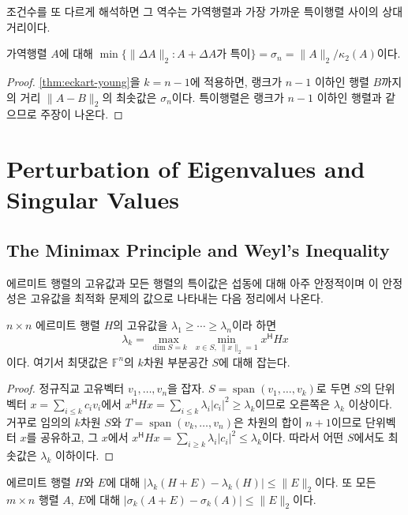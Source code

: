 조건수를 또 다르게 해석하면 그 역수는 가역행렬과 가장 가까운 특이행렬 사이의 상대 거리이다.

\begin{theorem}
\label{thm:dist-singular}
가역행렬 $A$에 대해 $\min\{\|\Delta A\|_2:A+\Delta A\text{가 특이}\}=\sigma_n=\|A\|_2/\kappa_2(A)$이다.
\end{theorem}

\begin{proof}
\cref{thm:eckart-young}을 $k=n-1$에 적용하면, 랭크가 $n-1$ 이하인 행렬 $B$까지의 거리 $\|A-B\|_2$의 최솟값은 $\sigma_n$이다. 특이행렬은 랭크가 $n-1$ 이하인 행렬과 같으므로 주장이 나온다.
\end{proof}

\section{Perturbation of Eigenvalues and Singular Values}
\label{sec:perturbation}

\subsection{The Minimax Principle and Weyl's Inequality}

에르미트 행렬의 고유값과 모든 행렬의 특이값은 섭동에 대해 아주 안정적이며 이 안정성은 고유값을 최적화 문제의 값으로 나타내는 다음 정리에서 나온다.

\begin{theorem}
\label{thm:courant-fischer}
$n\times n$ 에르미트 행렬 $H$의 고유값을 $\lambda_1\ge\cdots\ge\lambda_n$이라 하면
\[
\lambda_k=\max_{\dim S=k}\ \min_{x\in S,\ \|x\|_2=1}x^{\mathsf H}Hx
\]
이다. 여기서 최댓값은 $\mathbb{F}^n$의 $k$차원 부분공간 $S$에 대해 잡는다.
\end{theorem}

\begin{proof}
정규직교 고유벡터 $v_1,\dots,v_n$을 잡자. $S=\operatorname{span}(v_1,\dots,v_k)$로 두면 $S$의 단위벡터 $x=\sum_{i\le k}c_iv_i$에서 $x^{\mathsf H}Hx=\sum_{i\le k}\lambda_i|c_i|^2\ge\lambda_k$이므로 오른쪽은 $\lambda_k$ 이상이다. 거꾸로 임의의 $k$차원 $S$와 $T=\operatorname{span}(v_k,\dots,v_n)$은 차원의 합이 $n+1$이므로 단위벡터 $x$를 공유하고, 그 $x$에서 $x^{\mathsf H}Hx=\sum_{i\ge k}\lambda_i|c_i|^2\le\lambda_k$이다. 따라서 어떤 $S$에서도 최솟값은 $\lambda_k$ 이하이다.
\end{proof}

\begin{corollary}[Weyl]
\label{cor:weyl}
에르미트 행렬 $H$와 $E$에 대해 $|\lambda_k(H+E)-\lambda_k(H)|\le\|E\|_2$이다. 또 모든 $m\times n$ 행렬 $A$, $E$에 대해 $|\sigma_k(A+E)-\sigma_k(A)|\le\|E\|_2$이다.
\end{corollary}

